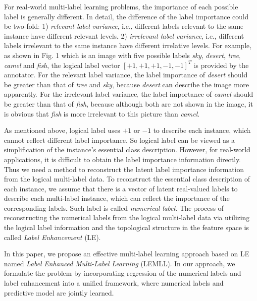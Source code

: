 \documentclass[conference]{IEEEtran}
\begin{document}
For real-world multi-label learning problems, the importance of each possible label is generally different. In detail, the difference of the label importance could be two-fold: 1) \emph{relevant label variance}, i.e., different labels relevant to the same instance have different relevant levels. 2) \emph{irrelevant label variance}, i.e., different labels irrelevant to the same instance have different irrelative levels. For example, as shown in Fig. 1 which is an image with five possible labels \emph{sky}, \emph{desert}, \emph{tree}, \emph{camel} and \emph{fish}, the logical label vector $[+1,+1,+1,-1,-1]^T$ is provided by the annotator. For the relevant label variance, the label importance of \emph{desert} should be greater than that of \emph{tree} and \emph{sky}, because \emph{desert} can describe the image more apparently. For the irrelevant label variance, the label importance of \emph{camel} should be greater than that of \emph{fish}, because although both are not shown in the image, it is obvious that \emph{fish} is more irrelevant to this picture than \emph{camel}.

As mentioned above, logical label uses $+1$ or $-1$ to describe each instance, which cannot reflect different label importance. So logical label can be viewed as a simplification of the instance's essential class description. However, for real-world applications, it is difficult to obtain the label importance information directly. Thus we need a method to reconstruct the latent label importance information from the logical multi-label data. To reconstruct the essential class description of each instance, we assume that there is a vector of latent real-valued labels to describe each multi-label instance, which can reflect the importance of the corresponding labels. Such label is called \emph{numerical label}. The process of reconstructing the numerical labels from the logical multi-label data via utilizing the logical label information and the topological structure in the feature space is called \emph{Label Enhancement} (LE).

In this paper, we propose an effective multi-label learning approach based on LE named \emph{ Label Enhanced Multi-Label Learning} (LEMLL). In our approach, we formulate the problem by incorporating regression of the numerical labels and label enhancement into a unified framework, where numerical labels and predictive model are jointly learned.
\end{document}

